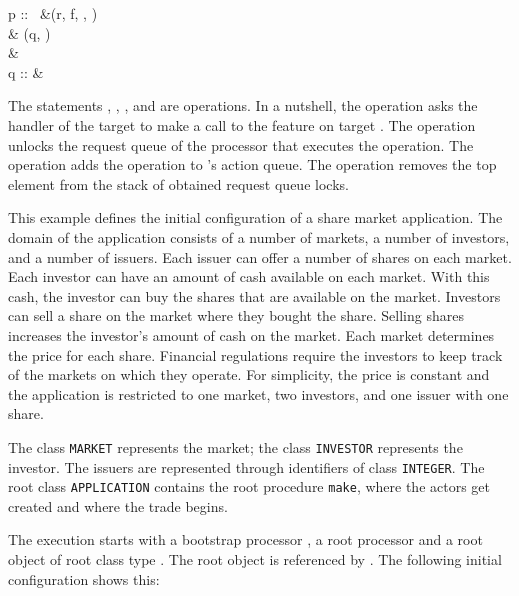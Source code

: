 \isolatedconfiguration
	{
		p :: \ &\calloperation(r, f, \tuple{}, \tuple{}) \statementseparator \\
		& \issueoperation(q, \unlockrequestqueueoperation) \statementseparator \\
		& \popobtainedrequestqueuelocksoperation \processorseparator \\
		q :: &
	}
	{\state}

The statements , , , and  are operations. In a nutshell, the  operation asks the handler of the target  to make a call to the feature  on target . The  operation unlocks the request queue of the processor that executes the operation. The  operation adds the  operation to 's action queue. The  operation removes the top element from the stack of obtained request queue locks.

\begin{fortechnicalreport}
\begin{example}
This example defines the initial configuration of a share market application. The domain of the application consists of a number of markets, a number of investors, and a number of issuers. Each issuer can offer a number of shares on each market. Each investor can have an amount of cash available on each market. With this cash, the investor can buy the shares that are available on the market. Investors can sell a share on the market where they bought the share. Selling shares increases the investor's amount of cash on the market. Each market determines the price for each share. Financial regulations require the investors to keep track of the markets on which they operate. For simplicity, the price is constant and the application is restricted to one market, two investors, and one issuer with one share.

The class \lstinline[language=SCOOP]!MARKET! represents the market; the class \lstinline[language=SCOOP]!INVESTOR! represents the investor. The issuers are represented through identifiers of class \lstinline[language=SCOOP]!INTEGER!. The root class \lstinline[language=SCOOP]!APPLICATION! contains the root procedure \lstinline[language=SCOOP]!make!, where the actors get created and where the trade begins.

The execution starts with a bootstrap processor , a root processor  and a root object  of root class type . The root object is referenced by . The following initial configuration shows this:


\end{example}
\end{fortechnicalreport}
